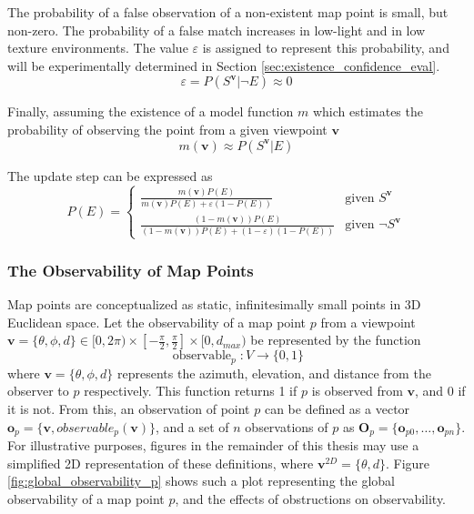 The probability of a false observation of a non-existent map point is small, but non-zero. The probability of a false match increases in low-light and in low texture environments. The value $\varepsilon$ is assigned to represent this probability, and will be experimentally determined in Section \ref{sec:existence_confidence_eval}.
$$
    \varepsilon = P(S^{\boldsymbol{v}}|\neg E) \approx 0
$$

Finally, assuming the existence of a model function $m$ which estimates the probability of observing the point from a given viewpoint $\boldsymbol{v}$
$$
    m(\boldsymbol{v}) \approx P(S^{\boldsymbol{v}}|E)
$$

The update step can be expressed as
\[
    P(E) = \begin{cases}
        \frac{m(\boldsymbol{v})P(E)}{m(\boldsymbol{v})P(E) + \varepsilon(1-P(E))}             & \text{given }S^{\boldsymbol{v}}      \\
        \frac{(1-m(\boldsymbol{v}))P(E)}{(1-m(\boldsymbol{v}))P(E) + (1-\varepsilon)(1-P(E))} & \text{given }\neg S^{\boldsymbol{v}}
    \end{cases}
\]

\subsubsection{The Observability of Map Points}

Map points are conceptualized as static, infinitesimally small points in 3D Euclidean space. Let the observability of a map point $p$ from a viewpoint $\boldsymbol{v} = \{\theta,\phi,d\}\in[0,2\pi)\times\left[-\frac{\pi}{2},\frac{\pi}{2}\right]\times[0,d_{max})$ be represented by the function
$$
    \operatorname{observable}_p : V \to \{0, 1\}
$$
where $\boldsymbol{v} = \{\theta,\phi,d\}$ represents the azimuth, elevation, and distance from the observer to $p$ respectively. This function returns 1 if $p$ is observed from $\boldsymbol{v}$, and 0 if it is not. From this, an observation of point $p$ can be defined as a vector $\boldsymbol{o}_p=\{\boldsymbol{v},observable_p(\boldsymbol{v})\}$, and a set of $n$ observations of $p$ as $\boldsymbol{O}_p=\{\boldsymbol{o}_{p0},\dots,\boldsymbol{o}_{pn}\}$. For illustrative purposes, figures in the remainder of this thesis may use a simplified 2D representation of these definitions, where $\boldsymbol{v}^{2D}=\{\theta,d\}$. Figure \ref{fig:global_observability_p} shows such a plot representing the global observability of a map point $p$, and the effects of obstructions on observability.

